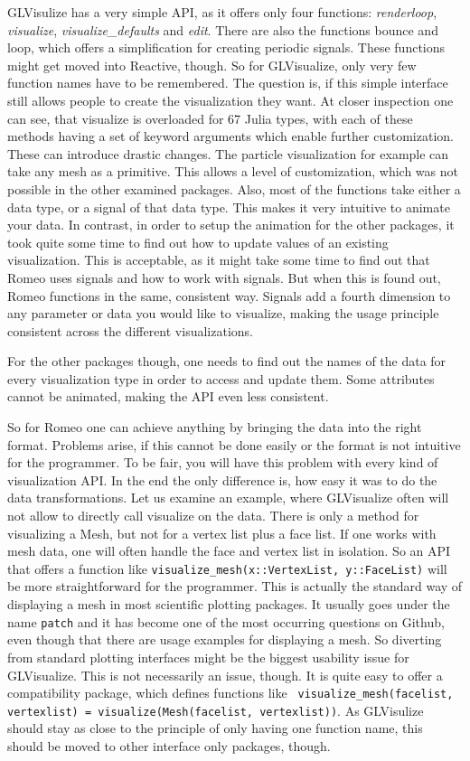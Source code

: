 {GLVisulize has a very simple API, as it offers only four functions: \textit{renderloop}, \textit{visualize}, \textit{visualize\_defaults} and \textit{edit}.
There are also the functions bounce and loop, which offers a simplification for creating periodic signals.
These functions might get moved into Reactive, though.
So for GLVisualize, only very few function names have to be remembered.
The question is, if this simple interface still allows people to create the visualization they want.
At closer inspection one can see, that visualize is overloaded for 67 Julia types, with each of these methods having a set of keyword arguments which enable further customization.
These can introduce drastic changes. The particle visualization for example can take any mesh as a primitive. This allows a level of customization, which was not possible in the other examined packages.
Also, most of the functions take either a data type, or a signal of that data type.
This makes it very intuitive to animate your data. 
In contrast, in order to setup the animation for the other packages, it took quite some time to find out how to update values of an existing visualization. This is acceptable, as it might take some time to find out that Romeo uses signals and how to work with signals.
But when this is found out, Romeo functions in the same, consistent way. Signals add a fourth dimension to any parameter or data you would like to visualize, making the usage principle consistent across the different visualizations.

For the other packages though, one needs to find out the names of the data for every visualization type in order to access and update them. Some attributes cannot be animated, making the API even less consistent.

So for Romeo one can achieve anything by bringing the data into the right format.
Problems arise, if this cannot be done easily or the format is not intuitive for the programmer.
To be fair, you will have this problem with every kind of visualization API. 
In the end the only difference is, how easy it was to do the data transformations. 
Let us examine an example, where GLVisualize often will not allow to directly call visualize on the data.
There is only a method for visualizing a Mesh, but not for a vertex list plus a face list. 
If one works with mesh data, one will often handle the face and vertex list in isolation.
So an API that offers a function like \texttt{visualize\_mesh(x::VertexList, y::FaceList)} will be more straightforward for the programmer.
This is actually the standard way of displaying a mesh in most scientific plotting packages. It usually goes under the name \texttt{patch} and it has become one of the most occurring questions on Github, even though that there are usage examples for displaying a mesh.
So diverting from standard plotting interfaces might be the biggest usability issue for GLVisualize.
This is not necessarily an issue, though. 
It is quite easy to offer a compatibility package, which defines functions like \texttt{
visualize\_mesh(facelist, vertexlist) = visualize(Mesh(facelist, vertexlist))}.
As GLVisulize should stay as close to the principle of only having one function name, this should be moved to other interface only packages, though.

}
